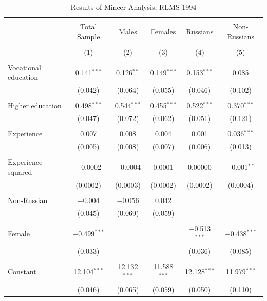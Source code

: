 \documentclass[12pt,a4paper]{article}
\numberwithin{equation}{section}
\begin{document}
{%
\begin{table}[!htbp] \centering 
  \caption{Results of Mincer Analysis, RLMS 1994} 
  \label{} 
\begin{tabular}{@{\extracolsep{5pt}}lccccc} 
\\[-1.8ex]\hline 
\hline \\[-1.8ex] 
 & Total Sample & Males & Females & Russians & Non-Russians \\ 
\\[-1.8ex] & (1) & (2) & (3) & (4) & (5)\\ 
\hline \\[-1.8ex] 
 Vocational education & 0.141$^{***}$ & 0.126$^{**}$ & 0.149$^{***}$ & 0.153$^{***}$ & 0.085 \\ 
  & (0.042) & (0.064) & (0.055) & (0.046) & (0.102) \\ 
  & & & & & \\ 
 Higher education & 0.498$^{***}$ & 0.544$^{***}$ & 0.455$^{***}$ & 0.522$^{***}$ & 0.370$^{***}$ \\ 
  & (0.047) & (0.072) & (0.062) & (0.051) & (0.121) \\ 
  & & & & & \\ 
 Experience & 0.007 & 0.008 & 0.004 & 0.001 & 0.036$^{***}$ \\ 
  & (0.005) & (0.008) & (0.007) & (0.006) & (0.013) \\ 
  & & & & & \\ 
 Experience squared & $-$0.0002 & $-$0.0004 & 0.0001 & 0.00000 & $-$0.001$^{**}$ \\ 
  & (0.0002) & (0.0003) & (0.0002) & (0.0002) & (0.0004) \\ 
  & & & & & \\ 
 Non-Russian & $-$0.004 & $-$0.056 & 0.042 &  &  \\ 
  & (0.045) & (0.069) & (0.059) &  &  \\ 
  & & & & & \\ 
 Female & $-$0.499$^{***}$ &  &  & $-$0.513$^{***}$ & $-$0.438$^{***}$ \\ 
  & (0.033) &  &  & (0.036) & (0.085) \\ 
  & & & & & \\ 
 Constant & 12.104$^{***}$ & 12.132$^{***}$ & 11.588$^{***}$ & 12.128$^{***}$ & 11.979$^{***}$ \\ 
  & (0.046) & (0.065) & (0.059) & (0.050) & (0.110) \\ 

\end{tabular}
\end{table}}
\end{document}
